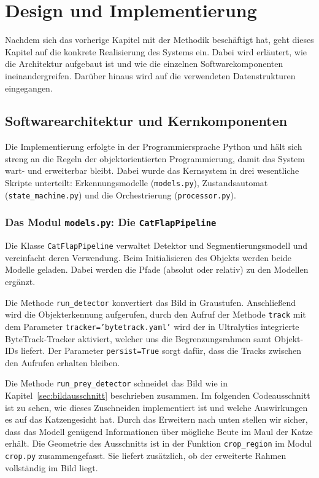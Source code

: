 \chapter{Design und Implementierung}
\label{sec:implementierung}

Nachdem sich das vorherige Kapitel mit der Methodik beschäftigt hat, geht dieses Kapitel auf die konkrete Realisierung des Systems ein. Dabei wird erläutert, wie die Architektur aufgebaut ist und wie die einzelnen Softwarekomponenten ineinandergreifen. Darüber hinaus wird auf die verwendeten Datenstrukturen eingegangen.

\section{Softwarearchitektur und Kernkomponenten}
Die Implementierung erfolgte in der Programmiersprache Python und hält sich streng an die Regeln der objektorientierten Programmierung, damit das System wart- und erweiterbar bleibt. Dabei wurde das Kernsystem in drei wesentliche Skripte unterteilt: Erkennungsmodelle (\texttt{models.py}), Zustandsautomat (\texttt{state\_machine.py}) und die Orchestrierung (\texttt{processor.py}).

\subsection{Das Modul \texttt{models.py}: Die \texttt{CatFlapPipeline}}
Die Klasse \texttt{CatFlapPipeline} verwaltet Detektor und Segmentierungsmodell und vereinfacht deren Verwendung. Beim Initialisieren des Objekts werden beide Modelle geladen. Dabei werden die Pfade (absolut oder relativ) zu den Modellen ergänzt.

Die Methode \texttt{run\_detector} konvertiert das Bild in Graustufen. Anschließend wird die Objekterkennung aufgerufen, durch den Aufruf der Methode \texttt{track} mit dem Parameter \texttt{tracker='bytetrack.yaml'} wird der in Ultralytics integrierte ByteTrack-Tracker aktiviert, welcher uns die Begrenzungsrahmen samt Objekt-IDs liefert. Der Parameter \texttt{persist=True} sorgt dafür, dass die Tracks zwischen den Aufrufen erhalten bleiben.

Die Methode \texttt{run\_prey\_detector} schneidet das Bild wie in Kapitel~\ref{sec:bildausschnitt} beschrieben zusammen. Im folgenden Codeausschnitt ist zu sehen, wie dieses Zuschneiden implementiert ist und welche Auswirkungen es auf das Katzengesicht hat. Durch das Erweitern nach unten stellen wir sicher, dass das Modell genügend Informationen über mögliche Beute im Maul der Katze erhält. Die Geometrie des Ausschnitts ist in der Funktion \texttt{crop\_region} im Modul \texttt{crop.py} zusammengefasst. Sie liefert zusätzlich, ob der erweiterte Rahmen vollständig im Bild liegt.

